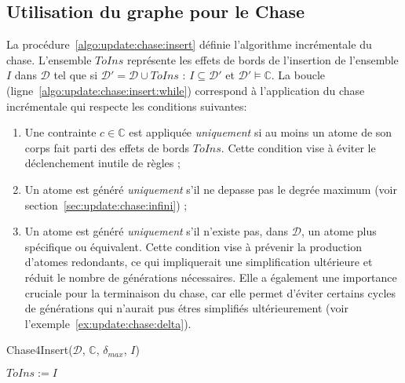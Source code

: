 \subsection{Utilisation du graphe pour le Chase}
La procédure~\ref{algo:update:chase:insert} définie l'algorithme incrémentale du \gls{chase}.
L'ensemble $ToIns$ représente les effets de bords de l'insertion de l'ensemble $I$ dans $\mathcal{D}$ tel que si $\mathcal{D}' = \mathcal{D} \cup ToIns$ : $I \subseteq \mathcal{D}'$ et $\mathcal{D}' \vDash \mathbb{C}$.
La boucle (ligne~\ref{algo:update:chase:insert:while}) correspond à l'application du \gls{chase} incrémentale qui respecte les conditions suivantes:
\begin{enumerate}[label=\textsf{\Circled{\arabic*}}]
    \item Une contrainte $c \in \mathbb{C}$ est appliquée \emph{uniquement} si au moins un atome de son corps fait parti des effets de bords $ToIns$.
          Cette condition vise à éviter le déclenchement inutile de règles ; \label{algo:update:chase:insert:c1}
    \item Un atome est généré \emph{uniquement} s'il ne depasse pas le degrée maximum (voir section~\ref{sec:update:chase:infini}) ; \label{algo:update:chase:insert:c2}
    \item Un atome est généré \emph{uniquement} s'il n'existe pas, dans $\mathcal{D}$, un atome plus spécifique ou équivalent.
          Cette condition vise à prévenir la production d'atomes redondants, ce qui impliquerait une simplification ultérieure et réduit le nombre de générations nécessaires.
          Elle a également une importance cruciale pour la terminaison du \gls{chase}, car elle permet d'éviter certains cycles de générations qui n'aurait pus étres simplifiés ultérieurement (voir l'exemple~\ref{ex:update:chase:delta}). \label{algo:update:chase:insert:c3}
\end{enumerate}

\begin{procedure}[htb]
    \caption{Chase4Insert($\mathcal{D}$, $\mathbb{C}$, $\delta_{max}$, $I$)}
    \label{algo:update:chase:insert}
    $ToIns := I$ \;
     \;
\end{procedure}

